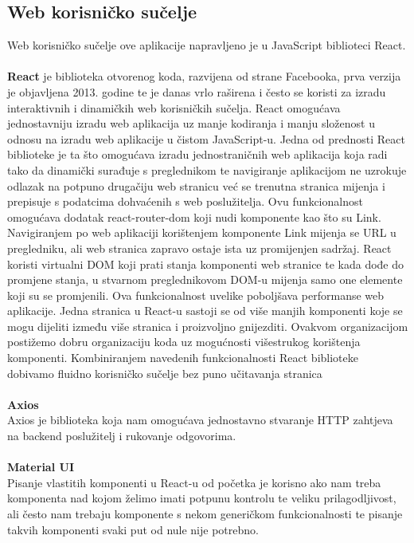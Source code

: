 \documentclass[times, utf8, zavrsni]{fer}
\begin{document}
\subsection{Web korisničko sučelje}
Web korisničko sučelje ove aplikacije napravljeno je u JavaScript biblioteci React. 
\\
\\ \textbf{React} je biblioteka otvorenog koda, razvijena od strane Facebooka,
prva verzija je objavljena 2013. godine te je danas vrlo raširena i često se koristi za izradu interaktivnih i dinamičkih web korisničkih sučelja. 
React omogućava jednostavniju izradu web aplikacija uz manje kodiranja i manju složenost u odnosu na izradu web aplikacije u čistom JavaScript-u.
Jedna od prednosti React biblioteke je ta što omogućava izradu jednostraničnih web aplikacija  koja radi tako 
da dinamički surađuje s preglednikom te navigiranje aplikacijom ne uzrokuje odlazak na potpuno drugačiju web stranicu već se trenutna stranica 
mijenja i prepisuje s podatcima dohvaćenih s web poslužitelja. Ovu funkcionalnost omogućava dodatak react-router-dom koji nudi komponente kao što su Link.
Navigiranjem po web aplikaciji korištenjem komponente Link mijenja se URL u pregledniku, ali web stranica zapravo ostaje ista uz promijenjen sadržaj.
React koristi virtualni DOM  koji prati stanja 
komponenti web stranice te kada dođe do promjene stanja, u stvarnom preglednikovom DOM-u mijenja samo one elemente koji su se promjenili. Ova 
funkcionalnost uvelike poboljšava performanse web aplikacije.
Jedna stranica u React-u sastoji se od više manjih komponenti koje se mogu dijeliti između više stranica i proizvoljno gnijezditi. Ovakvom organizacijom
postižemo dobru organizaciju koda uz mogućnosti višestrukog korištenja komponenti.
Kombiniranjem navedenih funkcionalnosti React biblioteke dobivamo fluidno korisničko sučelje bez puno učitavanja stranica 
\\
\\ \textbf{Axios}
\\ Axios je biblioteka koja nam omogućava jednostavno stvaranje HTTP zahtjeva na backend poslužitelj i rukovanje odgovorima.
\\
\\ \textbf{Material UI}
\\ Pisanje vlastitih komponenti u React-u od početka je korisno ako nam treba komponenta nad kojom želimo imati potpunu kontrolu te veliku prilagodljivost, ali
često nam trebaju komponente s nekom generičkom funkcionalnosti te pisanje takvih komponenti svaki put od nule nije potrebno. 
\end{document}
